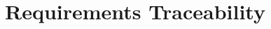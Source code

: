\documentclass[../DD.tex]{subfiles}
\begin{document}
\chapter{Requirements Traceability}
\thispagestyle{fancy}
		
		
\end{document}
